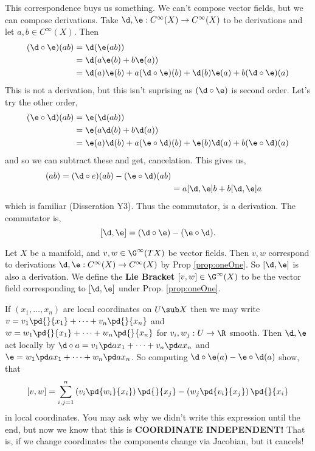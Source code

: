 This correspondence buys us something. We can't compose vector fields, but we can compose derivations. Take $\d, \e : C^\infty(X) \to C^\infty(X)$ to be derivations and let $a, b \in C^\infty(X)$. Then
\begin{align*}
  (\d \circ \e)(ab) &= \d (\e(ab)) \\
  &= \d(a \e(b) + b\e(a)) \\
  &= \d(a)\e(b) + a (\d \circ \e)(b) + \d(b)\e(a) + b (\d \circ \e)(a)
\end{align*}
This is not a derivation, but this isn't suprising as $(\d \circ \e)$ is second order. Let's try the other order,
\begin{align*}
  (\e \circ \d)(ab) &= \e (\d(ab)) \\
  &= \e(a \d(b) + b\d(a)) \\
  &= \e(a)\d(b) + a (\e \circ \d)(b) + \e(b)\d(a) + b (\e \circ \d)(a)
\end{align*}
and so we can subtract these and get, cancelation. This gives us,
\begin{align*}
  [\d, \e](ab) = (\d \circ e) (ab) - (\e \circ \d) (ab) \\
  &= a [\d, \e] b + b [\d, \e] a
\end{align*}
which is familiar (Disseration Y3). Thus the commutator, is a derivation. The commutator is,
$$ [\d, \e] = (\d \circ \e) - (\e \circ \d). $$

\begin{ndefi}
  Let $X$ be a manifold, and $v, w \in \G^\infty(TX)$ be vector fields. Then $v, w$ correspond to derivations $\d, \e : C^\infty(X) \to C^\infty(X)$ by Prop \ref{prop:oneOne}. So $[\d, \e]$ is also a derivation. We define the \textbf{Lie Bracket} $[v, w] \in \G^\infty(X)$ to be the vector field corresponding to $[\d, \e]$ under Prop. \ref{prop:oneOne}.
\end{ndefi}

\noindent
If $(x_1, \dots, x_n)$ are local coordinates on $U \sub X$ then we may write $v = v_1\pd{}{x_1} + \dots + v_n\pd{}{x_n}$ and $w = w_1\pd{}{x_1} + \dots + w_n\pd{}{x_n}$ for $v_i, w_j : U \to \R$ smooth. Then $\d, \e$ act locally by $\d \circ a = v_1 \pd a {x_1} + \dots + v_n \pd a {x_n}$ and
$\e = w_1 \pd a {x_1} + \dots + w_n \pd a {x_n}$. So computing $\d \circ \e (a) - \e \circ \d (a)$ show, that
$$ [v, w] = \sum_{i,j = 1}^n \left(v_i \pd {w_i}{x_i}\right) \pd{}{x_j} - \left(w_j \pd{v_i}{x_j}\right)\pd{}{x_i} $$
in local coordinates. You may ask why we didn't write this expression until the end, but now we know that this is \textbf{COORDINATE INDEPENDENT!} That is, if we change coordinates the components change via Jacobian, but it cancels!


